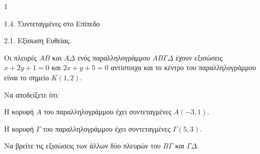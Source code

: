 \begin{ylh}{1}
    \item 1.4. Συντεταγμένες στο Επίπεδο
    \item 2.1. Εξίσωση Ευθείας.
\end{ylh}
Οι πλευρές $AB$ και $A\Delta$ ενός παραλληλογράμμου $AB\Gamma\Delta$ έχουν εξισώσεις $x+2y+1=0$ και $2x+y+5=0$ αντίστοιχα και το κέντρο του παραλληλογράμμου είναι το σημείο $K(1,2)$.
\begin{alist}
\item Να αποδείξετε ότι:
\begin{rlist}
\item Η κορυφή $A$ του παραλληλογράμμου έχει συντεταγμένες $A(-3, 1)$. 
\item Η κορυφή $\Gamma$ του παραλληλογράμμου έχει συντεταγμένες $\Gamma(5, 3)$. 
\end{rlist}
\item Να βρείτε τις εξισώσεις των άλλων δύο πλευρών του $B\Gamma$ και $\Gamma\Delta$. 
\end{alist}